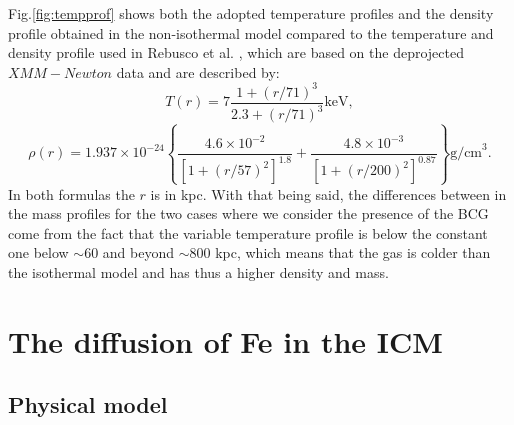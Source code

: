 \documentclass{article}
\begin{document}
Fig.\ref{fig:tempprof} shows both the adopted temperature profiles and the density profile obtained in the non-isothermal model compared to the temperature and density profile used in Rebusco et al. \cite{rebusco}, which are based on the deprojected $XMM-Newton$ data and are described by:
\begin{equation}
	T(r)=7\frac{1+(r/71)^{3}}{2.3+(r/71)^{3}}\text{keV},
\end{equation}
\begin{equation}
	\rho (r)=1.937\times 10^{-24}\left\{\frac{4.6\times 10^{-2}}{[1+(r/57)^{2}]^{1.8}}+\frac{4.8\times 10^{-3}}{[1+(r/200)^{2}]^{0.87}}\right\}\text{g/cm}^{3}.
\end{equation}
In both formulas the $r $ is in kpc. With that being said, the differences between in the mass profiles for the two cases where we consider the presence of the BCG come from the fact that the variable temperature profile is below the constant one below $\sim 60$ and beyond
$\sim 800$ kpc, which means that the gas is colder than the isothermal model and has thus a higher density and mass.

\section{The diffusion of Fe in the ICM}
\subsection{Physical model}
\end{document}
